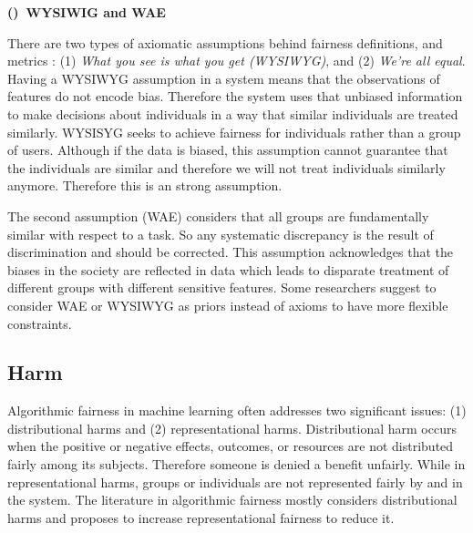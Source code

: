         \textbf{()~WYSIWIG and WAE}
        
        There are two types of axiomatic assumptions behind fairness definitions, and metrics \cite{friedler-impossibility-2021}: (1) \textit{What you see is what you get (WYSIWYG)}, and (2) \textit{We're all equal}. Having a WYSIWYG assumption in a system means that the observations of features do not encode bias. Therefore the system uses that unbiased information to make decisions about individuals in a way that similar individuals are treated similarly. WYSISYG seeks to achieve fairness for individuals rather than a group of users. Although if the data is biased, this assumption cannot guarantee that the individuals are similar and therefore we will not treat individuals similarly anymore. Therefore this is an strong assumption. 
        
        The second assumption (WAE) considers that all groups are fundamentally similar with respect to a task. So any systematic discrepancy is the result of discrimination and should be corrected. This assumption acknowledges that the biases in the society are reflected in data which leads to disparate treatment of different groups with different sensitive features. Some researchers suggest to consider WAE or WYSIWYG as priors instead of axioms to have more flexible constraints.
        
        
        
     
    \subsection{Harm}
        Algorithmic fairness in machine learning often addresses two significant issues: (1) distributional harms and (2) representational harms\cite{crawford2017trouble}. Distributional harm occurs when the positive or negative effects, outcomes, or resources are not distributed fairly among its subjects. Therefore someone is denied a benefit unfairly. While in representational harms, groups or individuals are not represented fairly by and in the system. The literature in algorithmic fairness mostly considers distributional harms and proposes to increase representational fairness to reduce it.
    
